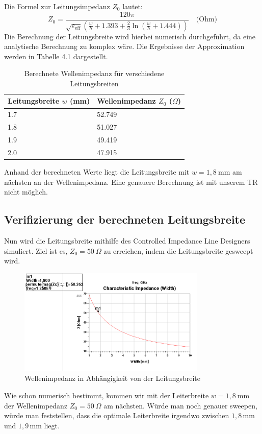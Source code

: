 Die Formel zur Leitungsimpedanz $Z_0$ lautet:
\begin{equation}
Z_0 = \frac{120 \pi}{\sqrt{\varepsilon_{\text{eff}}} \left( \frac{w}{h} + 1.393 + \frac{2}{3} \ln\left( \frac{w}{h} + 1.444 \right) \right)} \quad \text{(Ohm)}
\end{equation}
Die Berechnung der Leitungsbreite wird hierbei numerisch durchgeführt, da eine analytische Berechnung zu
komplex wäre. Die Ergebnisse der Approximation werden in Tabelle 4.1 dargestellt. \\
    
    \begin{table}[H]
        \centering
        \begin{tabular}{|l|l|}
            \hline
            \textbf{Leitungsbreite $w$ (mm)} & \textbf{Wellenimpedanz $Z_0$ ($\Omega$)} \\
            \hline
            1.7 & 52.749 \\
            1.8 & 51.027 \\
            1.9 & 49.419 \\
            2.0 & 47.915 \\
           
            \hline
        \end{tabular}
        \caption{Berechnete Wellenimpedanz für verschiedene Leitungsbreiten}
    \end{table}
    Anhand der berechneten Werte liegt die Leitungsbreite mit $w = 1{,}8~\mathrm{mm}$ am nächsten an der Wellenimpedanz.
    Eine genauere Berechnung ist mit unserem TR nicht möglich. 

       

    \subsection{Verifizierung der berechneten Leitungsbreite}
    Nun wird die Leitungsbreite mithilfe des Controlled Impedance Line Designers simuliert.
    Ziel ist es, $Z_0 = 50~\Omega$ zu erreichen, indem die Leitungsbreite gesweept wird.
    \begin{figure}[H]
        \centering
        \includegraphics[width=0.8\textwidth]{Pictures/LeitungsbreitenSweep.png}
        \caption{Wellenimpedanz in Abhängigkeit von der Leitungsbreite}
    \end{figure}
    Wie schon numerisch bestimmt, kommen wir mit der Leiterbreite $w=1{,}8~\mathrm{mm}$ der Wellenimpedanz $Z_0 = 50~\Omega$
    am nächsten. Würde man noch genauer sweepen, würde man feststellen, dass die optimale Leiterbreite irgendwo zwischen
    $1{,}8\,\mathrm{mm}$ und $1{,}9\,\mathrm{mm}$ liegt.

